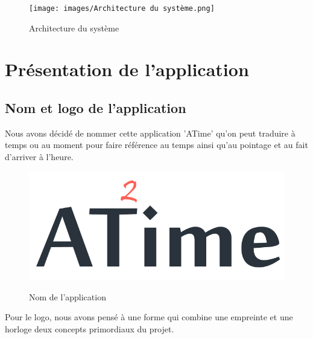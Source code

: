 \vspace{10pt}
    \begin{figure}[h!]
        \centering
        \texttt{[image: images/Architecture du système.png]}
        \label{fig84}
        \caption{Architecture du système}
        \label{figUFE}
    \end{figure} 
\clearpage        
\section{Présentation de l'application}

\subsection{Nom et logo de l'application}
Nous avons décidé de nommer cette application 'ATime' qu’on peut traduire à 
temps ou au moment pour faire référence au temps ainsi qu’au pointage et au fait 
d'arriver à l'heure.

    \begin{figure}[h!]
        \centering
        \includegraphics[scale=0.4 ]{images/graphique identity/app_name_dark.png}
        \label{fig85}
        \caption{Nom de l'application}
        \label{}
    \end{figure} 

Pour le logo, nous avons pensé à une forme qui combine une empreinte et une 
horloge deux concepts primordiaux du projet.


